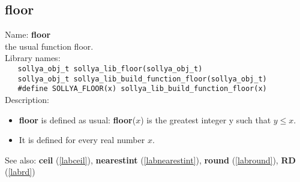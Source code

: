 \subsection{floor}
\label{labfloor}
\noindent Name: \textbf{floor}\\
\phantom{aaa}the usual function floor.\\[0.2cm]
\noindent Library names:\\
\verb|   sollya_obj_t sollya_lib_floor(sollya_obj_t)|\\
\verb|   sollya_obj_t sollya_lib_build_function_floor(sollya_obj_t)|\\
\verb|   #define SOLLYA_FLOOR(x) sollya_lib_build_function_floor(x)|\\[0.2cm]
\noindent Description: \begin{itemize}

\item \textbf{floor} is defined as usual: \textbf{floor}($x$) is the greatest integer y such that $y \le x$.

\item It is defined for every real number $x$.
\end{itemize}
See also: \textbf{ceil} (\ref{labceil}), \textbf{nearestint} (\ref{labnearestint}), \textbf{round} (\ref{labround}), \textbf{RD} (\ref{labrd})
